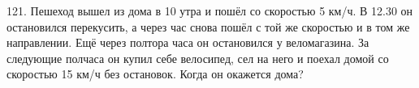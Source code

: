 121. Пешеход вышел из дома в 10 утра и пошёл со скоростью 5 км/ч. В 12.30 он остановился перекусить, а через час снова пошёл с той же скоростью и в том же направлении. Ещё через полтора часа он остановился у веломагазина. За следующие полчаса он купил себе велосипед, сел на него и поехал домой со скоростью 15 км/ч без остановок. Когда он окажется дома?\\
